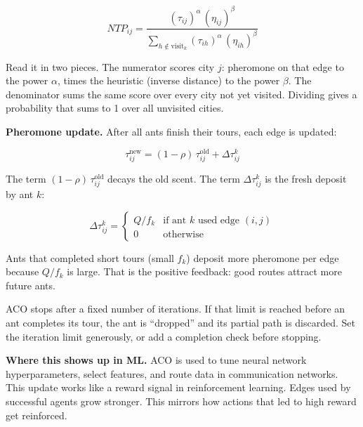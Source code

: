\documentclass[a4paper,11pt]{article}
\begin{document}
\begin{equation}
  NTP_{ij} = \frac{(\tau_{ij})^{\alpha}\,(\eta_{ij})^{\beta}}
               {\displaystyle\sum_{h \notin \text{visit}_k}
                (\tau_{ih})^{\alpha}\,(\eta_{ih})^{\beta}}
\end{equation}

Read it in two pieces.
The numerator scores city $j$: pheromone on that edge to the power
$\alpha$, times the heuristic (inverse distance) to the power $\beta$.
The denominator sums the same score over every city not yet visited.
Dividing gives a probability that sums to 1 over all unvisited cities.

\medskip
\noindent\textbf{Pheromone update.}
After all ants finish their tours, each edge is updated:

\begin{equation}
  \tau_{ij}^{\text{new}} = (1 - \rho)\,\tau_{ij}^{\text{old}} + \Delta\tau_{ij}^{k}
\end{equation}

The term $(1-\rho)\,\tau_{ij}^{\text{old}}$ decays the old scent.
The term $\Delta\tau_{ij}^{k}$ is the fresh deposit by ant $k$:

\begin{equation}
  \Delta\tau_{ij}^{k} =
  \begin{cases}
    Q/f_k & \text{if ant } k \text{ used edge } (i,j) \\
    0      & \text{otherwise}
  \end{cases}
\end{equation}

Ants that completed short tours (small $f_k$) deposit more pheromone per
edge because $Q/f_k$ is large.
That is the positive feedback: good routes attract more future ants.

\begin{watchout}
ACO stops after a fixed number of iterations.
If that limit is reached before an ant completes its tour, the ant is
``dropped'' and its partial path is discarded.
Set the iteration limit generously, or add a completion check before
stopping.
\end{watchout}

\textbf{Where this shows up in ML.}
ACO is used to tune neural network hyperparameters, select features, and
route data in communication networks.
This update works like a reward signal in reinforcement learning.
Edges used by successful agents grow stronger.
This mirrors how actions that led to high reward get reinforced.
\end{document}

